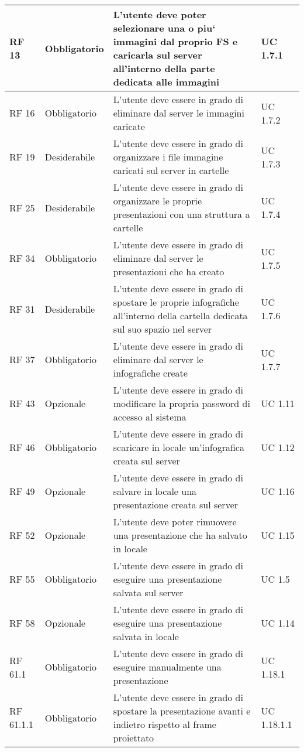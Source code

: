 {\begin{longtable} [c]{| p{2.5cm} | p{2.5cm} | p{6cm} |p{2.5cm}|}
			\hline
			RF 13 & Obbligatorio & L’utente deve poter selezionare una o piu` immagini dal proprio FS e caricarla sul server all’interno della parte dedicata alle immagini & UC 1.7.1\\
			\hline
			RF 16 & Obbligatorio & L’utente deve essere in grado di eliminare dal server le immagini caricate & UC 1.7.2\\			
			\hline
			RF 19 & Desiderabile & L'utente deve essere in grado di organizzare i file immagine caricati sul server in cartelle & UC 1.7.3\\
			\hline
			RF 25 & Desiderabile & L'utente deve essere in grado di organizzare le proprie presentazioni con una struttura a cartelle & UC 1.7.4\\
			\hline
			RF 34 & Obbligatorio & L’utente deve essere in grado di eliminare dal server le presentazioni che ha creato  & UC 1.7.5\\
			\hline
			RF 31 & Desiderabile & L'utente deve essere in grado di spostare le proprie infografiche all’interno della cartella dedicata sul suo spazio nel server & UC 1.7.6\\
			\hline
			RF 37 & Obbligatorio & L’utente deve essere in grado di eliminare dal server le infografiche create & UC 1.7.7\\
			\hline
			RF 43 & Opzionale & L'utente deve essere in grado di modificare la propria password di accesso al sistema & UC 1.11\\						
			\hline
			RF 46 & Obbligatorio & L'utente deve essere in grado di scaricare in locale un’infografica creata sul server & UC 1.12\\
			\hline
			RF 49 & Opzionale & L'utente deve essere in grado di salvare in locale una presentazione creata sul server & UC 1.16\\
			\hline
			RF 52 & Opzionale & L’utente deve poter rimuovere una presentazione che ha salvato in locale & UC 1.15\\
			\hline
			RF 55 & Obbligatorio & L'utente deve essere in grado di eseguire una presentazione salvata sul server & UC 1.5\\
			\hline
			RF 58 & Opzionale & L'utente deve essere in grado di eseguire una presentazione salvata in locale & UC 1.14\\
			\hline
			RF 61.1 & Obbligatorio & L'utente deve essere in grado di eseguire manualmente una presentazione & UC 1.18.1\\
			\hline
			RF 61.1.1 & Obbligatorio & L'utente deve essere in grado di spostare la presentazione avanti e indietro rispetto al frame proiettato & UC 1.18.1.1\\

\end{longtable}}

